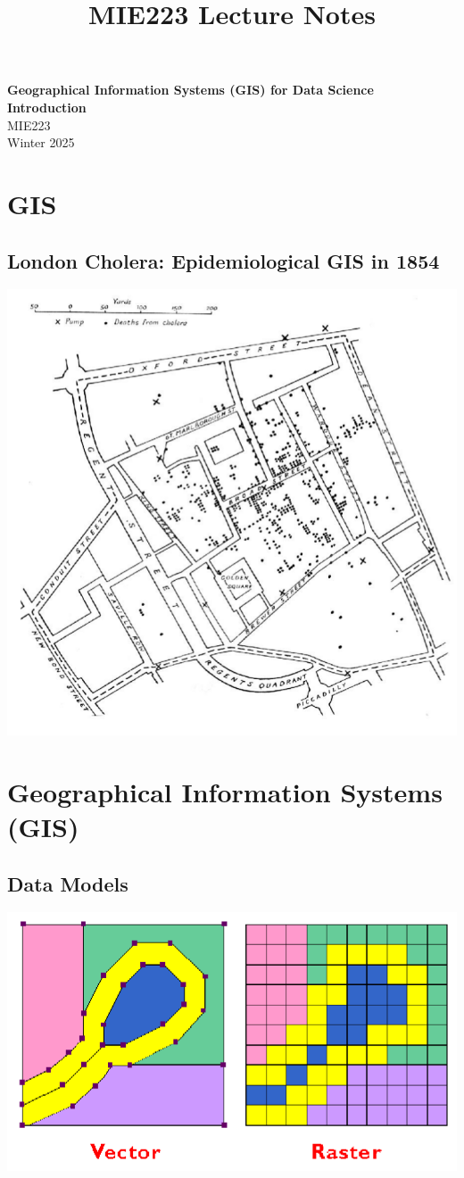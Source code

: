\documentclass[11pt]{article}
\theoremstyle{definition}
\begin{document}
\setcounter{section}{0}
\title{MIE223 Lecture Notes}

\thispagestyle{empty}

\begin{center}
{\LARGE \bf Geographical Information Systems (GIS)
for Data Science Introduction}\\
{\large MIE223}\\
Winter 2025
\end{center}
\section{GIS}
\subsection{London Cholera:
Epidemiological GIS in 1854}
\includegraphics[width=\textwidth/4]{1.png}

\section{Geographical Information
Systems (GIS)}
\subsection{Data Models}
\includegraphics[width=\textwidth/2]{2.png}
\end{document}
